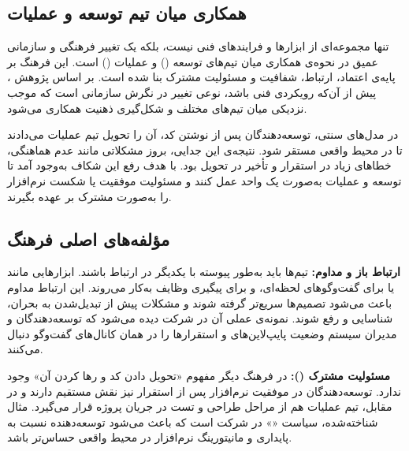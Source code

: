 
\subsection{همکاری میان تیم توسعه و عملیات}
\label{subsec:ch3-5-collaboration}

 تنها مجموعه‌ای از ابزارها و فرایندهای فنی نیست، بلکه یک تغییر فرهنگی و سازمانی عمیق در نحوه‌ی همکاری میان تیم‌های توسعه () و عملیات () است. این فرهنگ بر پایه‌ی اعتماد، ارتباط، شفافیت و مسئولیت مشترک بنا شده است. بر اساس پژوهش \cite{Jha2023}،  پیش از آن‌که رویکردی فنی باشد، نوعی تغییر در نگرش سازمانی است که موجب نزدیکی میان تیم‌های مختلف و شکل‌گیری ذهنیت همکاری می‌شود.

در مدل‌های سنتی، توسعه‌دهندگان پس از نوشتن کد، آن را تحویل تیم عملیات می‌دادند تا در محیط واقعی مستقر شود. نتیجه‌ی این جدایی، بروز مشکلاتی مانند عدم هماهنگی، خطاهای زیاد در استقرار و تأخیر در تحویل بود.  با هدف رفع این شکاف به‌وجود آمد تا توسعه و عملیات به‌صورت یک واحد عمل کنند و مسئولیت موفقیت یا شکست نرم‌افزار را به‌صورت مشترک بر عهده بگیرند.

\subsection{مؤلفه‌های اصلی فرهنگ }
\label{subsec:ch3-5-components}

\textbf{ارتباط باز و مداوم:} تیم‌ها باید به‌طور پیوسته با یکدیگر در ارتباط باشند. ابزارهایی مانند  یا  برای گفت‌وگوهای لحظه‌ای، و  برای پیگیری وظایف به‌کار می‌روند. این ارتباط مداوم باعث می‌شود تصمیم‌ها سریع‌تر گرفته شوند و مشکلات پیش از تبدیل‌شدن به بحران، شناسایی و رفع شوند. نمونه‌ی عملی آن در شرکت  دیده می‌شود که توسعه‌دهندگان و مدیران سیستم وضعیت پایپ‌لاین‌های  و استقرارها را در همان کانال‌های گفت‌وگو دنبال می‌کنند.

\textbf{مسئولیت مشترک ():} در فرهنگ  دیگر مفهوم «تحویل دادن کد و رها کردن آن» وجود ندارد. توسعه‌دهندگان در موفقیت نرم‌افزار پس از استقرار نیز نقش مستقیم دارند و در مقابل، تیم عملیات هم از مراحل طراحی و تست در جریان پروژه قرار می‌گیرد. مثال شناخته‌شده، سیاست «» در شرکت  است که باعث می‌شود توسعه‌دهنده نسبت به پایداری و مانیتورینگ نرم‌افزار در محیط واقعی حساس‌تر باشد.

